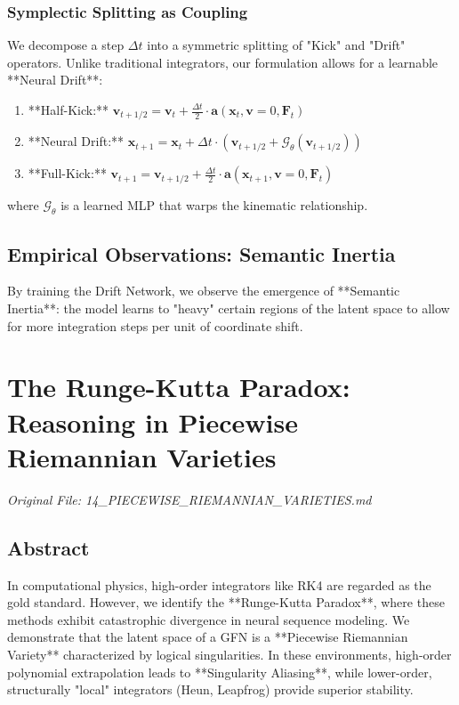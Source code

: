 \documentclass[11pt,a4paper]{report}
\begin{document}
\subsection{Symplectic Splitting as Coupling}
We decompose a step $\Delta t$ into a symmetric splitting of "Kick" and "Drift" operators. Unlike traditional integrators, our formulation allows for a learnable **Neural Drift**:
\begin{enumerate}
    \item **Half-Kick:** $\mathbf{v}_{t+1/2} = \mathbf{v}_t + \frac{\Delta t}{2} \cdot \mathbf{a}(\mathbf{x}_t, \mathbf{v}=0, \mathbf{F}_t)$
    \item **Neural Drift:** $\mathbf{x}_{t+1} = \mathbf{x}_t + \Delta t \cdot \left( \mathbf{v}_{t+1/2} + \mathcal{G}_\theta(\mathbf{v}_{t+1/2}) \right)$
    \item **Full-Kick:** $\mathbf{v}_{t+1} = \mathbf{v}_{t+1/2} + \frac{\Delta t}{2} \cdot \mathbf{a}(\mathbf{x}_{t+1}, \mathbf{v}=0, \mathbf{F}_t)$
\end{enumerate}
where $\mathcal{G}_\theta$ is a learned MLP that warps the kinematic relationship.

\section{Empirical Observations: Semantic Inertia}
By training the Drift Network, we observe the emergence of **Semantic Inertia**: the model learns to "heavy" certain regions of the latent space to allow for more integration steps per unit of coordinate shift.

\chapter{The Runge-Kutta Paradox: Reasoning in Piecewise Riemannian Varieties}
\textit{Original File: 14\_PIECEWISE\_RIEMANNIAN\_VARIETIES.md}

\section{Abstract}
In computational physics, high-order integrators like RK4 are regarded as the gold standard. However, we identify the **Runge-Kutta Paradox**, where these methods exhibit catastrophic divergence in neural sequence modeling. We demonstrate that the latent space of a GFN is a **Piecewise Riemannian Variety** characterized by logical singularities. In these environments, high-order polynomial extrapolation leads to **Singularity Aliasing**, while lower-order, structurally "local" integrators (Heun, Leapfrog) provide superior stability.
\end{document}
